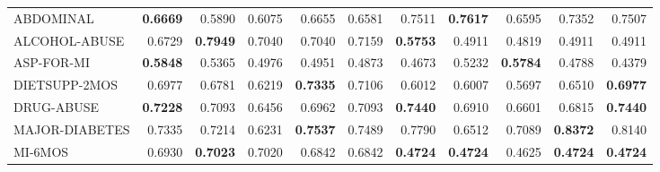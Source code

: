 \begin{table}[!t]
\begin{tabular}{lrrrrrrrrrr}
\textsf{ABDOMINAL}      & \textbf{0.6669} & 0.5890          & 0.6075 & 0.6655          & 0.6581 & 0.7511          & \textbf{0.7617} & 0.6595          & 0.7352          & 0.7507\\
\textsf{ALCOHOL-ABUSE}  & 0.6729          & \textbf{0.7949} & 0.7040 & 0.7040          & 0.7159 & \textbf{0.5753} & 0.4911          & 0.4819          & 0.4911          & 0.4911\\
\textsf{ASP-FOR-MI}     & \textbf{0.5848} & 0.5365          & 0.4976 & 0.4951          & 0.4873 & 0.4673          & 0.5232          & \textbf{0.5784} & 0.4788          & 0.4379\\
\textsf{DIETSUPP-2MOS}  & 0.6977          & 0.6781          & 0.6219 & \textbf{0.7335} & 0.7106 & 0.6012          & 0.6007          & 0.5697          & 0.6510          & \textbf{0.6977}\\
\textsf{DRUG-ABUSE}     & \textbf{0.7228} & 0.7093          & 0.6456 & 0.6962          & 0.7093 & \textbf{0.7440} & 0.6910          & 0.6601          & 0.6815          & \textbf{0.7440}\\
\textsf{MAJOR-DIABETES} & 0.7335          & 0.7214          & 0.6231 & \textbf{0.7537} & 0.7489 & 0.7790          & 0.6512          & 0.7089          & \textbf{0.8372} & 0.8140\\
\textsf{MI-6MOS}        & 0.6930          & \textbf{0.7023} & 0.7020 & 0.6842          & 0.6842 & \textbf{0.4724} & \textbf{0.4724} & 0.4625          & \textbf{0.4724} & \textbf{0.4724}\\

\bottomrule

\end{tabular}
\end{table}
\endgroup
